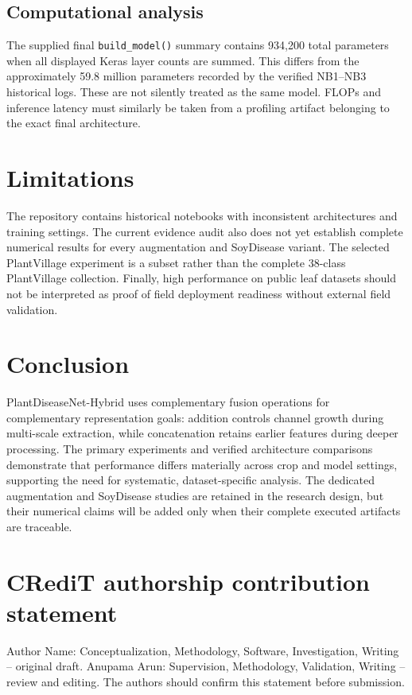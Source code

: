 \documentclass[a4paper,fleqn]{cas-dc}
\begin{document}
\subsection{Computational analysis}
The supplied final \texttt{build\_model()} summary contains 934,200 total parameters when all displayed Keras layer counts are summed. This differs from the approximately 59.8 million parameters recorded by the verified NB1--NB3 historical logs. These are not silently treated as the same model. FLOPs and inference latency must similarly be taken from a profiling artifact belonging to the exact final architecture.

\section{Limitations}
The repository contains historical notebooks with inconsistent architectures and training settings. The current evidence audit also does not yet establish complete numerical results for every augmentation and SoyDisease variant. The selected PlantVillage experiment is a subset rather than the complete 38-class PlantVillage collection. Finally, high performance on public leaf datasets should not be interpreted as proof of field deployment readiness without external field validation.

\section{Conclusion}
PlantDiseaseNet-Hybrid uses complementary fusion operations for complementary representation goals: addition controls channel growth during multi-scale extraction, while concatenation retains earlier features during deeper processing. The primary experiments and verified architecture comparisons demonstrate that performance differs materially across crop and model settings, supporting the need for systematic, dataset-specific analysis. The dedicated augmentation and SoyDisease studies are retained in the research design, but their numerical claims will be added only when their complete executed artifacts are traceable.

\section*{CRediT authorship contribution statement}
Author Name: Conceptualization, Methodology, Software, Investigation, Writing -- original draft. Anupama Arun: Supervision, Methodology, Validation, Writing -- review and editing. The authors should confirm this statement before submission.
\end{document}
